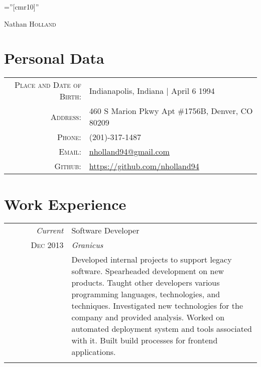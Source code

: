 \documentclass[a4paper,10pt]{article}
\begin{document}
\pagestyle{empty} %

\font\fb=''[cmr10]'' %

\par{\centering
		{\Huge Nathan \textsc{Holland}
	}\bigskip\par}

\section{Personal Data}

\begin{tabular}{rl}
  \textsc{Place and Date of Birth:} & Indianapolis, Indiana  | April 6 1994 \\
  \textsc{Address:}   & 460 S Marion Pkwy Apt \#1756B, Denver, CO 80209 \\
  \textsc{Phone:}     & (201)-317-1487\\
  \textsc{Email:}     & \href{mailto:nholland94@gmail.com}{nholland94@gmail.com}\\
  \textsc{Github:}    & \href{https://github.com/nholland94}{https://github.com/nholland94}
\end{tabular}

\section{Work Experience}
\begin{tabular}{r|p{11cm}}
  \ \ \ \ \ \ \ \emph{Current} & Software Developer\\
  \textsc{Dec 2013}            & \emph{Granicus} \\
                               & \footnotesize{Developed internal projects to support legacy software. Spearheaded development on new products. Taught other developers various programming languages, technologies, and techniques. Investigated new technologies for the company and provided analysis. Worked on automated deployment system and tools associated with it. Built build processes for frontend applications.}\\
  \multicolumn{2}{c}{}\\
\end{tabular}
\end{document}
